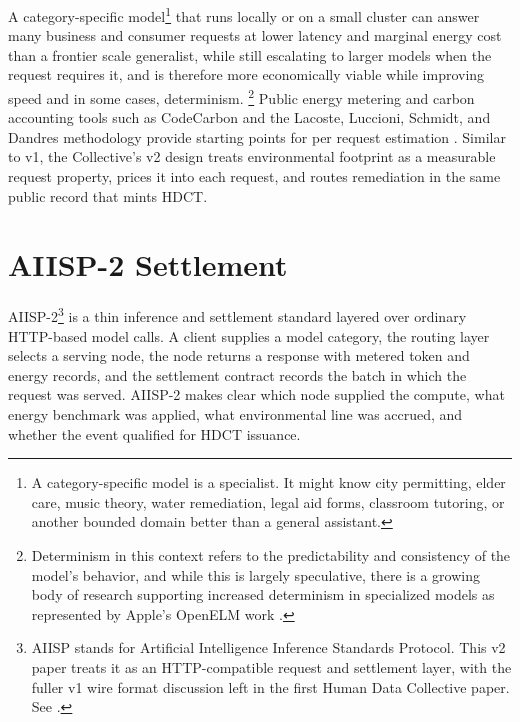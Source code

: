 \documentclass[10pt,a4paper,twocolumn]{article}
\begin{document}
A category-specific model\footnote{A category-specific model is a specialist. It might know city permitting, elder care, music theory, water remediation, legal aid forms, classroom tutoring, or another bounded domain better than a general assistant.} that runs locally or on a small cluster can answer many business and consumer requests at lower latency and marginal energy cost than a frontier scale generalist, while still escalating to larger models when the request requires it, and is therefore more economically viable while improving speed and in some cases, determinism. \footnote{Determinism in this context refers to the predictability and consistency of the model's behavior, and while this is largely speculative, there is a growing body of research supporting increased determinism in specialized models as represented by Apple's OpenELM work \citep{openelm2024}.} Public energy metering and carbon accounting tools such as CodeCarbon and the Lacoste, Luccioni, Schmidt, and Dandres methodology provide starting points for per request estimation \citep{codecarbon2024,lacoste2019mlco2}. Similar to v1, the Collective's v2 design treats environmental footprint as a measurable request property, prices it into each request, and routes remediation in the same public record that mints HDCT.

\section{AIISP-2 Settlement}
\label{sec:aiisp}

AIISP-2\footnote{AIISP stands for Artificial Intelligence Inference Standards Protocol. This v2 paper treats it as an HTTP-compatible request and settlement layer, with the fuller v1 wire format discussion left in the first Human Data Collective paper. See \citep{harshberger2026hdcv1}.} is a thin inference and settlement standard layered over ordinary HTTP-based model calls. A client supplies a model category, the routing layer selects a serving node, the node returns a response with metered token and energy records, and the settlement contract records the batch in which the request was served. AIISP-2 makes clear which node supplied the compute, what energy benchmark was applied, what environmental line was accrued, and whether the event qualified for HDCT issuance.
\end{document}
